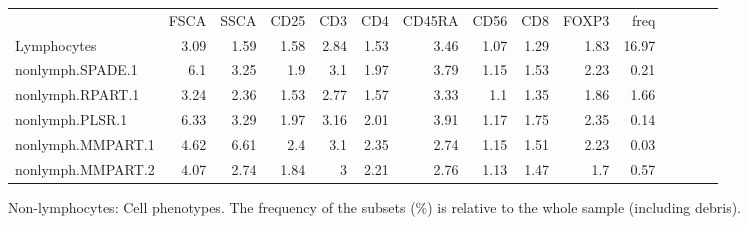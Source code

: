 \begin{table}[h]\footnotesize
\centering
\begin{tabular}{lrrrrrrrrrrrrrr}
\rowcolor{Gray} 
            & FSCA & SSCA & CD25 & CD3  & CD4  & CD45RA & CD56 & CD8  & FOXP3 & freq \\
Lymphocytes & 3.09 & 1.59 & 1.58 & 2.84 & 1.53 & 3.46   & 1.07 & 1.29 & 1.83  & 16.97 \\
\hline
nonlymph.SPADE.1     & 6.1  & 3.25 & 1.9  & 3.1  & 1.97 & 3.79   & 1.15 & 1.53 & 2.23  & 0.21 \\
nonlymph.RPART.1     & 3.24 & 2.36 & 1.53 & 2.77 & 1.57 & 3.33   & 1.1  & 1.35 & 1.86  & 1.66 \\
nonlymph.PLSR.1      & 6.33 & 3.29 & 1.97 & 3.16 & 2.01 & 3.91   & 1.17 & 1.75 & 2.35  & 0.14 \\
nonlymph.MMPART.1    & 4.62 & 6.61 & 2.4  & 3.1  & 2.35 & 2.74   & 1.15 & 1.51 & 2.23  & 0.03 \\
nonlymph.MMPART.2    & 4.07 & 2.74 & 1.84 & 3    & 2.21 & 2.76   & 1.13 & 1.47 & 1.7   & 0.57 \\
\end{tabular}
{ Non-lymphocytes: Cell phenotypes. }
{
    The frequency of the subsets (\%) is relative to the whole sample (including debris).
}
\end{table}


